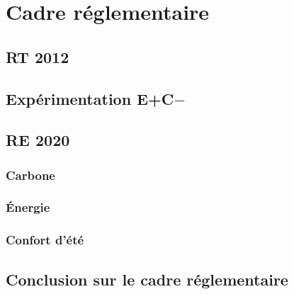 \part{Cadre réglementaire}

\chapter{RT 2012}

\chapter{Expérimentation E+C$-$}

\chapter{RE 2020}

\section{Carbone}

\section{Énergie}

\section{Confort d'été}

\chapter{Conclusion sur le cadre réglementaire}
